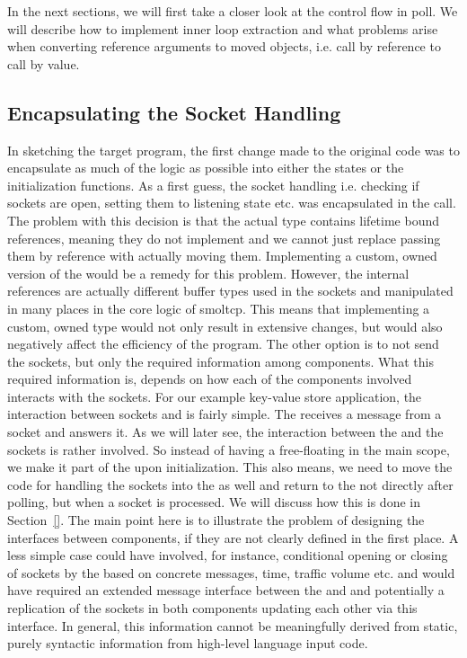 In the next sections, we will first take a closer look at the control flow in poll. We will describe how to implement inner loop extraction and what problems arise when converting reference arguments to moved objects, i.e. call by reference to call by value.

\subsection{Encapsulating the Socket Handling}
\label{subsec:SocketHandling}
In sketching the target program, the first change made to the original code was to encapsulate as much of the logic as possible into either the states or the initialization functions. As a first guess, the socket handling i.e. checking if sockets are open, setting them to listening state etc. was encapsulated in the  call. The problem with this decision is that the actual  type contains lifetime bound references, meaning they do not implement  and we cannot just replace passing them by reference with actually moving them. Implementing a custom, owned version of the  would be a remedy for this problem. However, the internal references are actually different buffer types used in the sockets and manipulated in many places in the core logic of smoltcp. This means that implementing a custom, owned  type would not only result in extensive changes, but would also negatively affect the efficiency of the program. The other option is to not send the sockets, but only the required information among components. What this required information is, depends on how each of the components involved interacts with the sockets. For our example key-value store application, the interaction between sockets and \store{} is fairly simple. The \store{} receives a message from a socket and answers it. As we will later see, the interaction between the \stack{} and the sockets is rather involved. So instead of having a free-floating  in the main scope, we make it part of the \stack{} upon initialization. This also means, we need to move the code for handling the sockets into the \stack{} as well and return to the \store{} not directly after polling, but when a socket is processed. We will discuss how this is done in Section~\ref{}. The main point here is to illustrate the problem of designing the interfaces between components, if they are not clearly defined in the first place. A less simple case could have involved, for instance, conditional opening or closing of sockets by the \store{} based on concrete messages, time, traffic volume etc. and would have required an extended message interface between the \stack{} and \store{} and potentially a replication of the sockets in both components updating each other via this interface. In general, this information cannot be meaningfully derived from static, purely syntactic information from high-level language input code.


